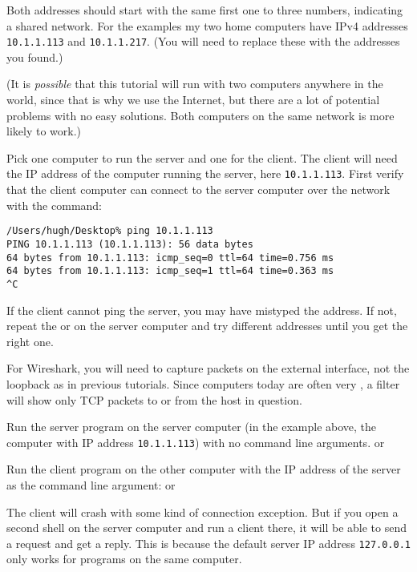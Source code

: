 Both addresses should start with the same first one to three numbers, indicating a
shared network.
For the examples my two home computers have IPv4 addresses \texttt{10.1.1.113}
and \texttt{10.1.1.217}. (You will need to replace these with the addresses you found.)

(It is \emph{possible} that this tutorial will run with two computers anywhere in the world,
since that is why we use the Internet, but there are a lot of potential problems
with no easy solutions. Both computers on the same network is more likely to work.)

Pick one computer to run the server and one for the client. The client will need the IP
address of the computer running the server, here \texttt{10.1.1.113}.
First verify that the client computer can
connect to the server computer over the network with the  command:

\begin{CODE}\begin{verbatim}
/Users/hugh/Desktop% ping 10.1.1.113
PING 10.1.1.113 (10.1.1.113): 56 data bytes
64 bytes from 10.1.1.113: icmp_seq=0 ttl=64 time=0.756 ms
64 bytes from 10.1.1.113: icmp_seq=1 ttl=64 time=0.363 ms
^C
\end{verbatim}\end{CODE}

If the client cannot ping the server, you may have mistyped the address.
If not, repeat the  or  on the server computer and try
different addresses until you get the right one.

For Wireshark, you will need to capture packets on the external interface, not the loopback
as in previous tutorials. Since computers today are often very , a filter
will show only TCP packets to or from the host in question.



\STEP Run the server program on the server computer (in the example above, the computer
with IP address \texttt{10.1.1.113}) with no command line arguments.
or

Run the client program on the other computer with the IP address of the server
as the command line argument:
or

The client will crash with some kind of connection exception. But if you open a second
shell on the server computer and run a client there, it will be able to send a request
and get a reply.
This is because the default server IP address \texttt{127.0.0.1}
only works for programs on the same computer.

